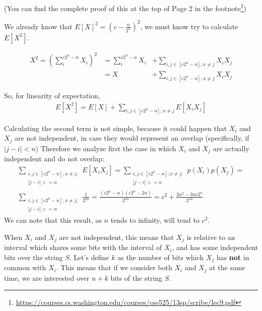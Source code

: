 \documentclass[a4paper,german]{article}
\begin{document}
(You can find the complete proof of this at the top of Page 2 in the footnote\footnote{\url{https://courses.cs.washington.edu/courses/cse525/13sp/scribe/lec9.pdf}})

We already know that $E[X]^2 = (c - \frac{n}{2^n})^2$, we must know try to calculate $E[X^2]$.

\begin{equation}
\begin{aligned} 
	X^2 = \left(\sum_i^{c2^n-n}  X_i\right)^2 &= \sum_i^{c2^n-n} X_i &+ 
\sum_{i,j \in [c2^n-n]; x \neq j} X_i X_j   \\
	&= X &+ \sum_{i,j \in [c2^n-n]; x \neq j} X_i X_j 
\end{aligned}
\end{equation}

So, for linearity of expectation,
\begin{equation}
\begin{aligned} 
	E[X^2] = E[X] + \sum_{i,j \in [c2^n-n]; x \neq j} E[X_i X_j]
\end{aligned}
\end{equation}

Calculating the second term is not simple, because it could happen that $X_i$ and $X_j$ are not independent, in case they would represent an overlap (specifically, if $|j - i| < n$)
Therefore we analyze first the case in which $X_i$ and $X_j$ are actually independent and do not overlap:
\begin{equation}
\begin{aligned} 
\sum_{\substack{i,j \in [c2^n-n]; x \neq j;\\ |j-i|>=n}} E[X_i X_j] = 
\sum_{\substack{i,j \in [c2^n-n]; x \neq j;\\ |j-i|>=n}} p(X_i)p(X_j) =   \\
\sum_{\substack{i,j \in [c2^n-n]; x \neq j;\\ |j-i|>=n}} \frac{1}{2^{2n}} =
	\frac{(c2^n -n)(c2^n -2n)}{2^{2n}} = c^2 + \frac{2n^2 - 3nc2^n}{2^{2n}}
\end{aligned}
\end{equation}
We can note that this result, as $n$ tends to infinity, will tend to $c^2$. 

When $X_i$ and $X_j$ are not independent, this means that $X_j$ is relative to an interval which shares some bits with the interval of $X_i$, and has some independent bits over the string $S$. Let's define $k$ as the number of bits which $X_j$ has \textbf{not} in common with $X_i$. This means that if we consider both $X_i$ and $X_j$ at the same time, we are interested over $n +k$ bits of the string $S$.
\end{document}
